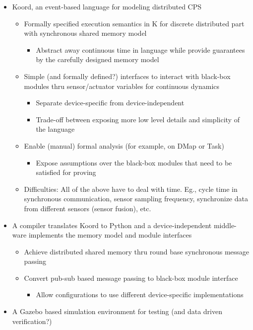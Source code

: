 \begin{itemize}
\item Koord, an event-based language for modeling distributed CPS
\begin{itemize}
\item Formally specified execution semantics in K for discrete distributed part with synchronous shared memory model
\begin{itemize}
    \item Abstract away continuous time in language while provide guarantees by the carefully designed memory model
\end{itemize}
\item Simple (and formally defined?) interfaces to interact with black-box modules thru sensor/actuator variables for continuous dynamics
\begin{itemize}
\item Separate device-specific from device-independent
\item Trade-off between exposing more low level details and simplicity of the language
\end{itemize}
\item Enable (manual) formal analysis (for example, on DMap or Task)
\begin{itemize}
\item Expose assumptions over the black-box modules that need to be satisfied for proving
\end{itemize}
\item Difficulties: All of the above have to deal with time. Eg., cycle time in synchronous communication, sensor sampling frequency, synchronize data from different sensors (sensor fusion), etc.
\end{itemize}
\item  A compiler translates Koord to Python and a device-independent middle-ware implements the memory model and module interfaces
\begin{itemize}
\item Achieve distributed shared memory thru round base synchronous message passing
\item Convert pub-sub based message passing to black-box module interface
\begin{itemize}
\item Allow configurations to use different device-specific implementations
\end{itemize}
\end{itemize}
\item A Gazebo based simulation environment for testing (and data driven verification?)

\end{itemize}
